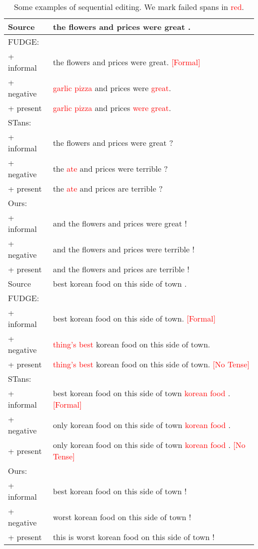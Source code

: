 \documentclass[11pt]{article}
\newcommand{\senc}[1]{\textcolor{red}{#1}}
\begin{document}
\begin{table}[t]
    \centering
    \vspace{-15pt}
    \setlength{}
    \scriptsize
    \begin{tabular}{ll}
    \toprule
         Source & the flowers and prices were great . \\
         \midrule
           FUDGE:&\\
         + informal&the flowers and prices were great. \senc{[Formal]}\\
         \quad + negative& \senc{garlic pizza} and prices were \senc{great}.\\
         \quad\quad + present&\senc{garlic pizza} and prices \senc{were great}.\\
          STans:&\\
         + informal&the flowers and prices were great ?\\
         \quad+ negative&the \senc{ate} and prices were terrible ?\\
         \quad\quad+ present&the \senc{ate} and prices are terrible ?\\
          Ours:& \\
         + informal& and the flowers and prices were great ! \\
         \quad+ negative& and the flowers and prices were terrible !\\
         \quad\quad+ present& and the flowers and prices are terrible !\\\midrule
         Source & best korean food on this side of town .\\\midrule
         FUDGE:&\\
         + informal&best korean food on this side of town. \senc{[Formal]}\\
         \quad+ negative&\senc{thing's best} korean food on this side of town.\\
         \quad\quad+ present &\senc{thing's best} korean food on this side of town. \senc{[No Tense]}\\
          STans:&\\
         + informal&best korean food on this side of town \senc{korean food} . \senc{[Formal]}\\
         \quad+ negative&only korean food on this side of town \senc{korean food} .\\
         \quad\quad+ present&only korean food on this side of town \senc{korean food} . \senc{[No Tense]}\\
          Ours:& \\
          + informal&best korean food on this side of town ! \\
         \quad + negative& worst korean food on this side of town ! \\
          \quad\quad+ present& this is worst korean food on this side of town !\\\bottomrule
    \end{tabular}
\caption{Some examples of sequential editing. We mark failed spans in \senc{red}. }
    \label{tab:seq_edit_part}
    \vspace{-10pt}
\end{table}
\end{document}
